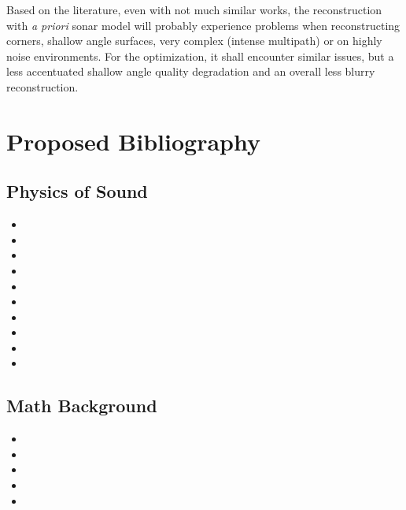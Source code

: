 \documentclass{article}
\begin{document}
 Based on the literature, even with not much similar works, the reconstruction
 with \textit{a priori} sonar model will probably experience problems when
 reconstructing corners, shallow angle surfaces, very complex (intense
 multipath) or on highly noise environments. For the optimization, it shall
 encounter similar issues, but a less accentuated shallow angle quality
 degradation and an overall less blurry reconstruction.

\section{Proposed Bibliography}



\subsection{Physics of Sound}
\begin{itemize}
  \item {}
  \item {}
  \item {}
  \item {}
  \item {}
  \item {}
  \item {}
  \item {}
  \item {}
  \item {}
\end{itemize}

\subsection{Math Background}
\begin{itemize}
  \item {}
  \item {}
  \item {}
  \item {}
  \item {}
\end{itemize}
\end{document}
